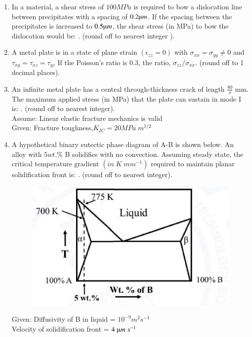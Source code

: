 \documentclass[journal]{IEEEtran}
\theoremstyle{remark}
\begin{document}
\begin{enumerate}[resume]
\item In a material, a shear stress of $100 MPa$ is required to bow a dislocation
line between precipitates with a spacing of $0.2 \micro m$. If the spacing between
the precipitates is increased to $0.5 \micro m$, the shear stress (in MPa) to bow the
dislocation would be: \underline {\hspace{2cm}}. (round off to nearest integer ). \hfill{}

\item A metal plate is in a state of plane strain $(\epsilon_{zz}=0)$ with $\sigma_{xx}=\sigma_{yy}\neq0$  and $\tau_{xy}=\tau_{xz}=\tau_{yz}$ If the Poisson's ratio is 0.3, the ratio, $\sigma_{zz} / \sigma_{xx}$\underline {\hspace{2cm}}. (round off to 1 decimal places). \hfill{}

\item An infinite metal plate has a central through-thickness crack of length $\frac{80}{\pi}$ mm. The maximum applied stress (in MPa) that the plate can sustain in
mode I is:  \underline {\hspace{2cm}}. (round off to nearest integer).\\
Assume: Linear elastic fracture mechanics is valid\\
Given: Fracture toughness,$K_{IC}=20MPa\;m^{1/2}$
\hfill{}

\item A hypothetical binary eutectic phase diagram of A-B is shown below. An
alloy with $5 wt.\%$ B solidifies with no convection. Assuming steady state,
the critical temperature gradient $(in\; K \;mm^{-1})$ required to maintain planar
solidification front is:  \underline {\hspace{2cm}}. (round off to nearest integer). \hfill{}
\begin{figure}[H]
    \centering
    \includegraphics[width=0.5\linewidth]{figs/Q.50.png}
    \caption{}
    \label{fig:placeholder}
\end{figure}
Given: Diffusivity of B in liquid = $10^{-9} m^2 s^{-1}$\\
Velocity of solidification front = $4\; \micro m \;s^{-1}$


\end{enumerate}
\end{document}
